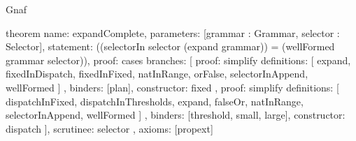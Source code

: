\begin{lexlean}{Gnaf}
\begin{semanticmodule}
theorem{
  name: expandComplete,
  parameters: [grammar : Grammar, selector : Selector],
  statement: ((selectorIn selector (expand grammar)) = (wellFormed grammar selector)),
  proof: cases{
    branches: [
      {
        proof: simplify{
          definitions: [
            expand,
            fixedInDispatch,
            fixedInFixed,
            natInRange,
            orFalse,
            selectorInAppend,
            wellFormed
          ]
        },
        binders: [plan],
        constructor: fixed
      },
      {
        proof: simplify{
          definitions: [
            dispatchInFixed,
            dispatchInThresholds,
            expand,
            falseOr,
            natInRange,
            selectorInAppend,
            wellFormed
          ]
        },
        binders: [threshold, small, large],
        constructor: dispatch
      }
    ],
    scrutinee: selector
  },
  axioms: [propext]
}


\end{semanticmodule}
\end{lexlean}
